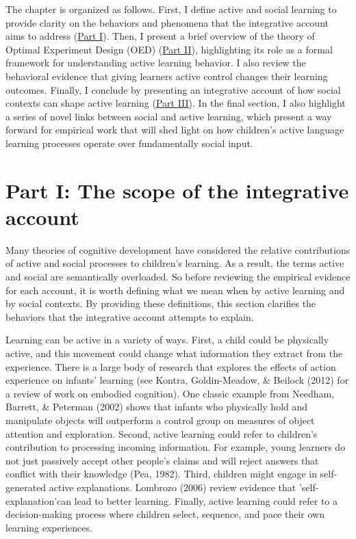 \documentclass[oneside]{report}
\begin{document}
The chapter is organized as follows. First, I define active and social
learning to provide clarity on the behaviors and phenomena that the
integrative account aims to address (\protect\hyperlink{scope}{Part I}).
Then, I present a brief overview of the theory of Optimal Experiment
Design (OED) (\protect\hyperlink{oed}{Part II}), highlighting its role
as a formal framework for understanding active learning behavior. I also
review the behavioral evidence that giving learners active control
changes their learning outcomes. Finally, I conclude by presenting an
integrative account of how social contexts can shape active learning
(\protect\hyperlink{active_social}{Part III}). In the final section, I
also highlight a series of novel links between social and active
learning, which present a way forward for empirical work that will shed
light on how children's active language learning processes operate over
fundamentally social input.

\hypertarget{scope}{%
\section{Part I: The scope of the integrative account}\label{scope}}

Many theories of cognitive development have considered the relative
contributions of active and social processes to children's learning. As
a result, the terms active and social are semantically overloaded. So
before reviewing the empirical evidence for each account, it is worth
defining what we mean when by active learning and by social contexts. By
providing these definitions, this section clarifies the behaviors that
the integrative account attempts to explain.

Learning can be active in a variety of ways. First, a child could be
physically active, and this movement could change what information they
extract from the experience. There is a large body of research that
explores the effects of action experience on infants' learning (see
Kontra, Goldin-Meadow, \& Beilock (2012) for a review of work on
embodied cognition). One classic example from Needham, Barrett, \&
Peterman (2002) shows that infants who physically hold and manipulate
objects will outperform a control group on measures of object attention
and exploration. Second, active learning could refer to children's
contribution to processing incoming information. For example, young
learners do not just passively accept other people's claims and will
reject answers that conflict with their knowledge (Pea, 1982). Third,
children might engage in self-generated active explanations. Lombrozo
(2006) review evidence that 'self-explanation'can lead to better
learning. Finally, active learning could refer to a decision-making
process where children select, sequence, and pace their own learning
experiences.
\end{document}

